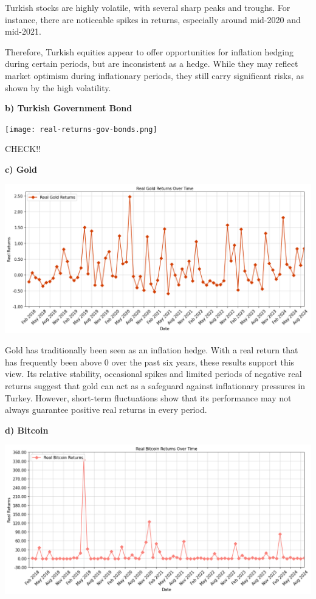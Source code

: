 \documentclass[
]{article}
\begin{document}
Turkish stocks are highly volatile, with several sharp peaks and troughs. For instance, there are noticeable spikes in returns, especially around mid-2020 and mid-2021.

Therefore, Turkish equities appear to offer opportunities for inflation hedging during certain periods, but are inconsistent as a hedge. While they may reflect market optimism during inflationary periods, they still carry significant risks, as shown by the high volatility.

\textbf{b) Turkish Government Bond}

\texttt{[image: real-returns-gov-bonds.png]}

CHECK!!

\textbf{c) Gold}

\includegraphics[width=\textwidth]{real-returns-gold.png}

Gold has traditionally been seen as an inflation hedge. With a real return that has frequently been above 0 over the past six years, these results support this view. Its relative stability, occasional spikes and limited periods of negative real returns suggest that gold can act as a safeguard against inflationary pressures in Turkey. However, short-term fluctuations show that its performance may not always guarantee positive real returns in every period.

\textbf{d) Bitcoin}

\includegraphics[width=\textwidth]{real-returns-bitcoin.png}
\end{document}
